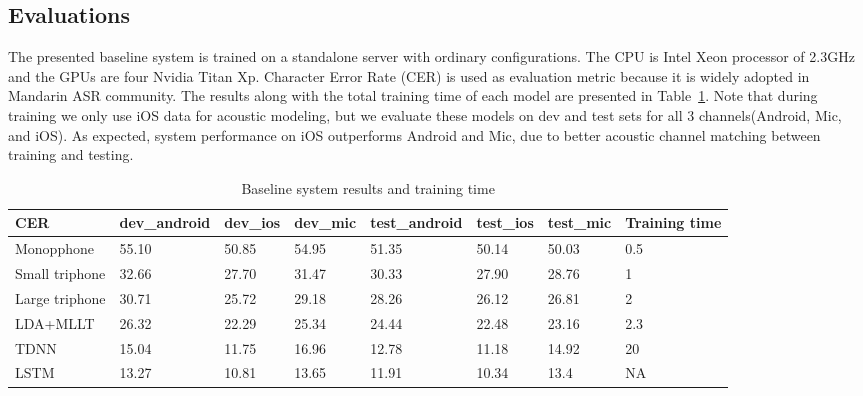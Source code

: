 \documentclass[a4paper]{article}
\begin{document}
\subsection{Evaluations}

The presented baseline system is trained on a standalone server with ordinary
configurations. The CPU is Intel Xeon processor of 2.3GHz and the GPUs are four
Nvidia Titan Xp. Character Error Rate (CER) is used as evaluation metric because
it is widely adopted in Mandarin ASR community. The results along with the total
training time of each model are presented in Table~\ref{tab:base}. Note that
during training we only use iOS data for acoustic modeling, but we evaluate
these models on dev and test sets for all 3 channels(Android, Mic, and iOS). As
expected, system performance on iOS outperforms Android and Mic, due to better
acoustic channel matching between training and testing.

\begin{table}[th]
  \caption{Baseline system results and training time}
  \label{tab:base}
  \centering
  \begin{tabular}{ llllllll }
    \toprule
    CER               &  dev\_android           &  dev\_ios           &  dev\_mic           & test\_android            &  test\_ios           &  test\_mic          &  Training time         \\
    \midrule
    Monopphone        &  55.10                 &  50.85             &  54.95             &  51.35                  &  50.14              &  50.03             &  0.5                   \\
    Small triphone    &  32.66                 &  27.70             &  31.47             &  30.33                  &  27.90              &  28.76             &  1                     \\
    Large triphone    &  30.71                 &  25.72             &  29.18             &  28.26                  &  26.12              &  26.81             &  2                     \\
    LDA+MLLT          &  26.32                 &  22.29             &  25.34             &  24.44                  &  22.48              &  23.16             &  2.3                   \\
    TDNN              &  15.04                 &  11.75             &  16.96             &  12.78                  &  11.18              &  14.92             &  20                    \\
    LSTM              &  13.27                 &  10.81             &  13.65             &  11.91                  &  10.34              &  13.4              &  NA                    \\
    \bottomrule
  \end{tabular}
\end{table}
\end{document}
